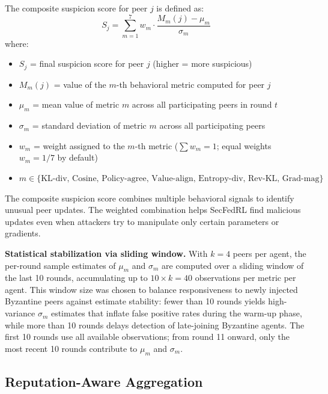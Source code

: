 \documentclass[12pt,a4paper]{article}
\begin{document}
The composite suspicion score for peer $j$ is defined as:
\begin{equation}
  S_j = \sum_{m=1}^{7} w_m \cdot \frac{M_m(j) - \mu_m}{\sigma_m}
  \label{eq:suspicion}
\end{equation}
where:
\begin{itemize}
  \item $S_j$ = final suspicion score for peer $j$ (higher = more suspicious)
  \item $M_m(j)$ = value of the $m$-th behavioral metric computed for peer $j$
  \item $\mu_m$ = mean value of metric $m$ across all participating peers in round $t$
  \item $\sigma_m$ = standard deviation of metric $m$ across all participating peers
  \item $w_m$ = weight assigned to the $m$-th metric ($\sum w_m = 1$; equal weights $w_m = 1/7$ by default)
  \item $m \in \{\text{KL-div, Cosine, Policy-agree, Value-align, Entropy-div, Rev-KL, Grad-mag}\}$
\end{itemize}

The composite suspicion score combines multiple behavioral signals to identify unusual
peer updates. The weighted combination helps SecFedRL find malicious updates even when
attackers try to manipulate only certain parameters or gradients.

\noindent\textbf{Statistical stabilization via sliding window.}
With $k=4$ peers per agent, the per-round sample estimates of $\mu_m$ and $\sigma_m$
are computed over a sliding window of the last 10 rounds, accumulating up to
$10 \times k = 40$ observations per metric per agent. This window size was chosen to
balance responsiveness to newly injected Byzantine peers against estimate stability:
fewer than 10 rounds yields high-variance $\sigma_m$ estimates that inflate false
positive rates during the warm-up phase, while more than 10 rounds delays detection
of late-joining Byzantine agents. The first 10 rounds use all available observations;
from round 11 onward, only the most recent 10 rounds contribute to $\mu_m$ and $\sigma_m$.

\subsection{Reputation-Aware Aggregation}
\end{document}

